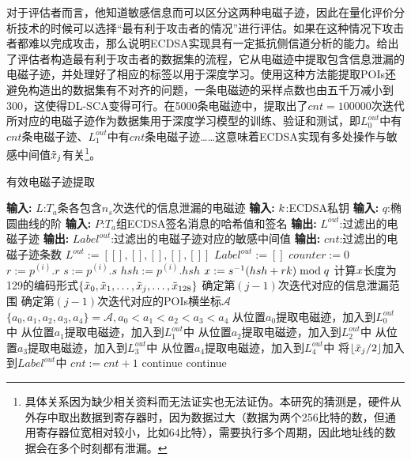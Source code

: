 {{	对于评估者而言，他知道敏感信息而可以区分这两种电磁子迹，因此在量化评价分析技术的时候可以选择“最有利于攻击者的情况”进行评估。如果在这种情况下攻击者都难以完成攻击，那么说明ECDSA实现具有一定抵抗侧信道分析的能力。给出了评估者构造最有利于攻击者的数据集的流程，它从电磁迹中提取包含信息泄漏的电磁子迹，并处理好了相应的标签以用于深度学习。使用这种方法能提取POIs还避免构造出的数据集有不对齐的问题，一条电磁迹的采样点数也由五千万减小到300，这使得DL-SCA变得可行。在5000条电磁迹中，提取出了$cnt=100000$次迭代所对应的电磁子迹作为数据集用于深度学习模型的训练、验证和测试，即$L_0^{out}$中有$cnt$条电磁子迹、$L_1^{out}$中有$cnt$条电磁子迹……这意味着ECDSA实现有多处操作与敏感中间值$\tilde {x}_j$有关\footnote{具体关系因为缺少相关资料而无法证实也无法证伪。本研究的猜测是，硬件从外存中取出数据到寄存器时，因为数据过大（数据为两个256比特的数，但通用寄存器位宽相对较小，比如64比特），需要执行多个周期，因此地址线的数据会在多个时刻都有泄漏。}。
	
	\begin{breakablealgorithm}
		\caption{有效电磁子迹提取}\label{alg:filter}
		\begin{algorithmic}[1]
			\Statex \textbf{输入:} $L$:$T_a$条各包含$n_s$次迭代的信息泄漏的电磁迹
			\Statex \textbf{输入:} $k$:ECDSA私钥
			\Statex \textbf{输入:} $q$:椭圆曲线的阶
			\Statex \textbf{输入:} $P$:$T_a$组ECDSA签名消息的哈希值和签名
			\Statex \textbf{输出:} $L^{out}$:过滤出的电磁子迹
			\Statex \textbf{输出:} $Label^{out}$:过滤出的电磁子迹对应的敏感中间值
			\Statex \textbf{输出:} $cnt$:过滤出的电磁子迹条数
			\State $L^{out}:=\left[ [],[],[],[],[]\right] $
			\State $Label^{out}:=[]$
			\State $counter:=0$
				\State $r:=p^{(i)}.r$
				\State $s:=p^{(i)}.s$
				\State $hsh:=p^{(i)}.hsh$
				\State $x:=s^{-1}(hsh+rk)\bmod q$
				\State 计算$x$长度为129的编码形式$\left\{\tilde{x}_0,\tilde{x}_1,\dots,\tilde{x}_j,\dots, \tilde{x}_{128}\right\}$
						\State 确定第$(j-1)$次迭代对应的信息泄漏范围
						\State 确定第$(j-1)$次迭代对应的POIs横坐标$\mathcal A$
							\State $\{a_0,a_1,a_2,a_3,a_4\}=\mathcal A,a_0<a_1<a_2<a_3<a_4$
							\State 从位置$a_0$提取电磁迹，加入到$L_0^{out}$中
							\State 从位置$a_1$提取电磁迹，加入到$L_1^{out}$中
							\State 从位置$a_2$提取电磁迹，加入到$L_2^{out}$中
							\State 从位置$a_3$提取电磁迹，加入到$L_3^{out}$中
							\State 从位置$a_4$提取电磁迹，加入到$L_4^{out}$中
							\State 将$\left\lfloor\tilde{x}_j/2\right\rfloor$加入到$Label^{out}$中
							\State $cnt:=cnt+1$
						\Else
							\State continue
						\EndIf
					\Else
						\State continue
					\EndIf
				\EndFor
			\EndFor
		\end{algorithmic}
	\end{breakablealgorithm}
	
}}

